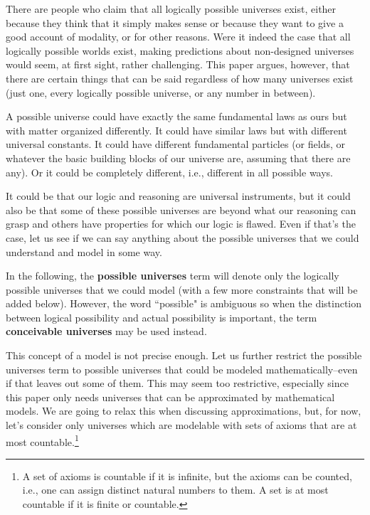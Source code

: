 \documentclass[a4paper
,draft
]{article}
\newcommand{\paper}[1]{paper}
\newcommand{\definitie}[1]{\textbf{#1}}
\newcommand{\ghilimele}[1]{``#1"}
\begin{document}
There are people who claim that all logically possible universes exist,
either because they think that it simply makes sense or because they want to
give a good account of modality, or for other reasons.
Were it indeed the case that all logically possible worlds exist, making predictions about
non-designed universes would seem, at first sight, rather challenging.
This \paper{} argues, however, that there are certain things that can be said
regardless of how many universes exist (just one, every logically
possible universe, or any number in between).

A possible universe
could have exactly the same fundamental laws as ours but with matter
organized differently.
It could have similar laws but with different universal constants.
It could have different fundamental particles (or fields, or whatever the basic
building blocks of our universe are, assuming that there are any).
Or it could be completely different, i.e., different in all possible ways.

It could be that our logic and reasoning are universal instruments,
but it could also be that some of these possible universes are
beyond what our reasoning can grasp and others have properties
for which our logic is flawed.
Even if that's the case, let us see if we can say anything about
the possible universes that we could understand and model in some way.

In the following, the \definitie{possible universes} term will denote
only the logically possible universes that we could model (with a few
more constraints that will be added below). However, the word
\ghilimele{possible} is ambiguous so when the distinction between logical
possibility and actual possibility is important, the
term \definitie{conceivable universes} may be used instead.

This concept of a model is not precise enough.
Let us further restrict the possible universes term
to possible universes that could be modeled mathematically–even
if that leaves out some of them.
This may seem too restrictive,
especially since this paper only needs universes that can be approximated
by mathematical models.
We are going to relax this when discussing approximations, but, for now,
let's consider only universes
which are modelable with sets of axioms that are at most countable.\footnote{
  A set of axioms is countable if it is infinite,
  but the axioms can be counted, i.e.,
  one can assign distinct natural numbers to them.
  A set is at most countable if it is finite or countable.
}
\end{document}
